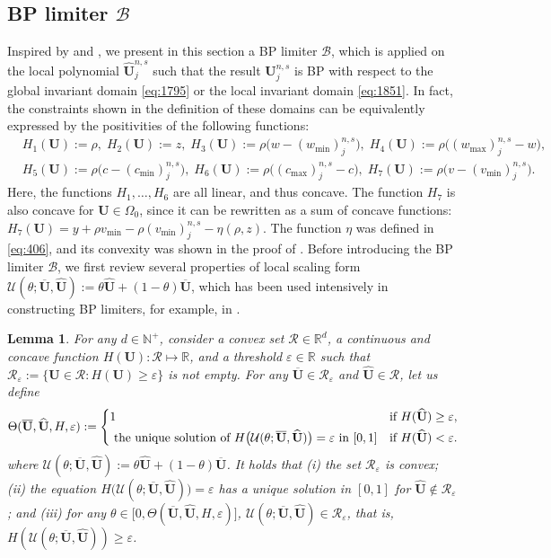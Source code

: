 \documentclass[times,final]{elsarticle}
\newtheorem{lemma}[theorem]{Lemma}
\numberwithin{equation}{section}
\theoremstyle{definition}
\theoremstyle{remark}
\newcommand{\BU}{\mathbf{U}}
\newcommand{\hBU}{\widehat{\BU}}
\newcommand{\oBU}{\overline{\BU}}
\begin{document}
\subsection{BP limiter $\mathcal{B}$}\label{sec:1594}

Inspired by \cite{zhang2010maximum} and \cite{zhang2011maximum}, we present in this section a BP limiter $\mathcal{B}$, which is applied on the local polynomial $\hBU_j^{n,s}$ such that the result $\BU_j^{n,s}$ is BP with respect to the global invariant domain \eqref{eq:1795} or the local invariant domain \eqref{eq:1851}.
In fact, the constraints shown in the definition of these domains can be equivalently expressed by the positivities of the following functions:
\begin{align*}
	& H_1(\BU) := \rho, \;
	H_2(\BU) := z, \;
	H_{3}(\BU)
	:= \rho \big( w - (w_{\min})^{n,s}_j \big), \;
	H_{4}(\BU)
	:= \rho \big( (w_{\max})^{n,s}_j - w \big),
	\\
	& H_{5}(\BU)
	:= \rho \big( c - (c_{\min})^{n,s}_j \big), \;
	H_{6}(\BU)
	:= \rho \big( (c_{\max})^{n,s}_j - c \big), \;
	H_7(\BU) := 
	\rho \big(v-(v_{\min})_j^{n,s}\big).
\end{align*}
Here, the functions $H_1,\dots,H_6$ are all linear, and thus concave. The function $H_7$ is also concave for $\BU \in \Omega_0$, since it can be rewritten as a sum of concave functions: 
$H_7(\BU) = y + \rho v_{\min} - \rho (v_{\min})_j^{n,s} - \eta(\rho,z)$. The function $\eta$ was defined in \eqref{eq:406}, and its convexity was shown in the proof of .
Before introducing the BP limiter $\mathcal{B}$, we first review several properties of local scaling form $\mathcal{U}(\theta;\oBU,\hBU) := \theta \hBU + (1-\theta) \oBU$, which has been used intensively in constructing BP limiters, for example, in \cite{zhang2011maximum,zhang2010maximum}.

\begin{lemma}\label{lem:1467}
	For any $d \in \mathbb{N}^+$, consider a convex set $\mathcal{R} \in \mathbb{R}^d$, a continuous and concave function $H(\BU): \mathcal{R} \mapsto \mathbb{R}$, and a threshold $\varepsilon \in \mathbb{R}$ such that $\mathcal{R}_\varepsilon := \{\BU \in \mathcal{R} : H(\BU) \ge \varepsilon \}$ is not empty.
	For any $\oBU \in \mathcal{R}_\varepsilon$ and $\hBU \in \mathcal{R}$, let us define
	\[
	\Theta(\oBU,\hBU,H,\varepsilon) :=
	\begin{dcases}
		1 & \textrm{if }H(\hBU) \ge \varepsilon, \\
		\textrm{ the unique solution of } H\big(\mathcal{U}(\theta;\oBU,\hBU)\big) = \varepsilon \textrm{ in } [0,1] & \textrm{if }H(\hBU) < \varepsilon.
	\end{dcases}
	\]
	where $\mathcal{U}(\theta;\oBU,\hBU) := \theta \hBU + (1-\theta) \oBU$.
	It holds that
	(i) the set $\mathcal{R}_\varepsilon$ is convex; 
	(ii) the equation $H\big(\mathcal{U}(\theta;\oBU,\hBU)\big) = \varepsilon$ has a unique solution in $[0,1]$ for $\hBU \not \in \mathcal{R}_\varepsilon$; and
	(iii) for any $\theta \in \big[0,\Theta(\oBU,\hBU,H,\varepsilon)\big]$, $\mathcal{U}(\theta;\oBU,\hBU) \in \mathcal{R}_\varepsilon$, that is, $H(\mathcal{U}(\theta;\oBU,\hBU)) \ge \varepsilon$.
\end{lemma}
\end{document}
